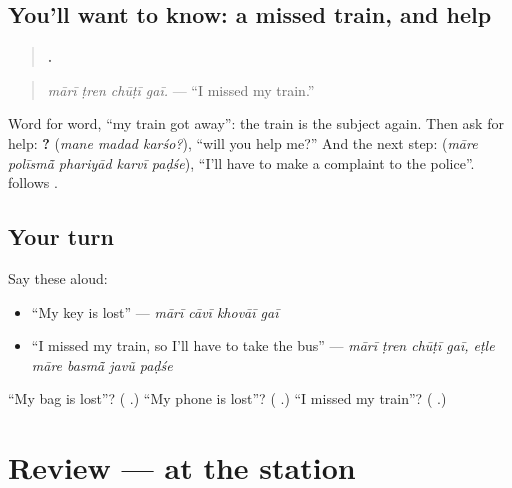 \subsection*{You'll want to know: a missed train, and help}
\begin{quote}
\textbf{   .}
\end{quote}

\begin{quote}
\emph{mārī ṭren chūṭī gaī.} — \textquotedblleft{}I missed my train.\textquotedblright{}
\end{quote}

Word for word, \textquotedblleft{}my train got away\textquotedblright{}: the train is the subject again. Then ask for help: \textbf{  ?} (\emph{mane madad karśo?}), \textquotedblleft{}will you help me?\textquotedblright{} And the next step: \textbf{    } (\emph{māre polīsmā̃ phariyād karvī paḍśe}), \textquotedblleft{}I'll have to make a complaint to the police\textquotedblright{}. \textbf{} follows \textbf{}.

\subsection*{Your turn}
Say these aloud:

\begin{itemize}
\raggedright
  \item \textquotedblleft{}My key is lost\textquotedblright{} — \emph{mārī cāvī khovāī gaī}
  \item \textquotedblleft{}I missed my train, so I'll have to take the bus\textquotedblright{} — \emph{mārī ṭren chūṭī gaī, eṭle māre basmā̃ javũ paḍśe}
\end{itemize}

\begin{tcolorbox}[breakable,colback=teal!4,colframe=teal!35!black,title={Before you move on}]
\textquotedblleft{}My bag is lost\textquotedblright{}? (\textbf{   }.) \textquotedblleft{}My phone is lost\textquotedblright{}? (\textbf{   }.) \textquotedblleft{}I missed my train\textquotedblright{}? (\textbf{   }.)
\end{tcolorbox}
\section[(review)]{Review — at the station}

